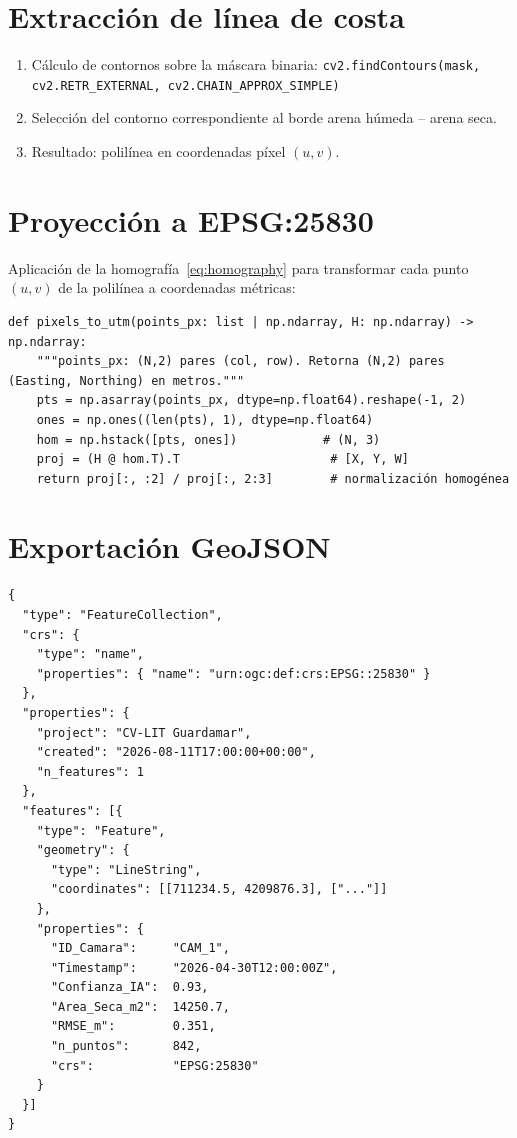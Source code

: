 \section{Extracción de línea de costa}

\begin{enumerate}[leftmargin=1.5em]
  \item Cálculo de contornos sobre la máscara binaria:
        \texttt{cv2.findContours(mask, cv2.RETR\_EXTERNAL, cv2.CHAIN\_APPROX\_SIMPLE)}
  \item Selección del contorno correspondiente al borde arena húmeda -- arena seca.
  \item Resultado: polilínea en coordenadas píxel $(u, v)$.
\end{enumerate}

\section{Proyección a EPSG:25830}

Aplicación de la homografía~\eqref{eq:homography} para transformar cada punto $(u,v)$
de la polilínea a coordenadas métricas:

\begin{codebox}
\begin{verbatim}
def pixels_to_utm(points_px: list | np.ndarray, H: np.ndarray) -> np.ndarray:
    """points_px: (N,2) pares (col, row). Retorna (N,2) pares (Easting, Northing) en metros."""
    pts = np.asarray(points_px, dtype=np.float64).reshape(-1, 2)
    ones = np.ones((len(pts), 1), dtype=np.float64)
    hom = np.hstack([pts, ones])            # (N, 3)
    proj = (H @ hom.T).T                     # [X, Y, W]
    return proj[:, :2] / proj[:, 2:3]        # normalización homogénea
\end{verbatim}
\end{codebox}

\section{Exportación GeoJSON}

\begin{codebox}
\begin{verbatim}
{
  "type": "FeatureCollection",
  "crs": {
    "type": "name",
    "properties": { "name": "urn:ogc:def:crs:EPSG::25830" }
  },
  "properties": {
    "project": "CV-LIT Guardamar",
    "created": "2026-08-11T17:00:00+00:00",
    "n_features": 1
  },
  "features": [{
    "type": "Feature",
    "geometry": {
      "type": "LineString",
      "coordinates": [[711234.5, 4209876.3], ["..."]]
    },
    "properties": {
      "ID_Camara":     "CAM_1",
      "Timestamp":     "2026-04-30T12:00:00Z",
      "Confianza_IA":  0.93,
      "Area_Seca_m2":  14250.7,
      "RMSE_m":        0.351,
      "n_puntos":      842,
      "crs":           "EPSG:25830"
    }
  }]
}
\end{verbatim}
\end{codebox}

